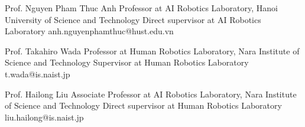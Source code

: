 %
%
%


\begin{referees}
		{Prof. Nguyen Pham Thuc Anh}
		{Professor at AI Robotics Laboratory, Hanoi University of Science and Technology}
		{Direct supervisor at AI Robotics Laboratory}
		{anh.nguyenphamthuc@hust.edu.vn}
        
		{Prof. Takahiro Wada}
		{Professor at Human Robotics Laboratory, Nara Institute of Science and Technology}
		{Supervisor at Human Robotics Laboratory}
		{t.wada@is.naist.jp}
        
		{Prof. Hailong Liu}
		{Associate Professor at AI Robotics Laboratory, Nara Institute of Science and Technology}
		{Direct supervisor at Human Robotics Laboratory}
		{liu.hailong@is.naist.jp}
\end{referees}
